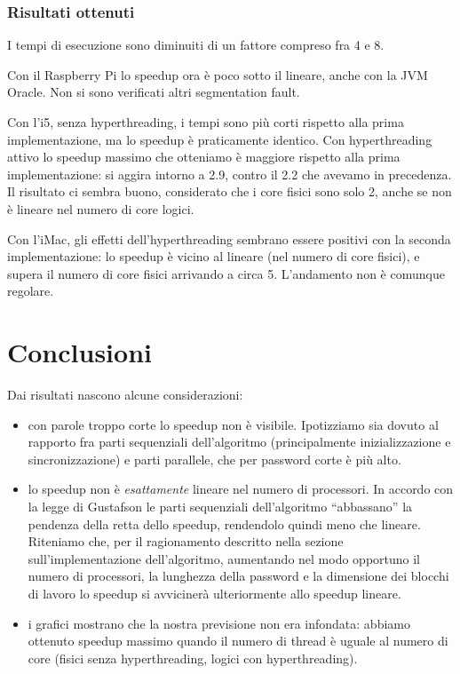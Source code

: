 \documentclass[]{myarticle}
\begin{document}
\subsubsection{Risultati ottenuti}

I tempi di esecuzione sono diminuiti di un fattore compreso fra 4 e 8.

Con il Raspberry Pi lo speedup ora \`e poco sotto il lineare, anche con la JVM Oracle.
Non si sono verificati altri segmentation fault.

Con l'i5, senza hyperthreading, i tempi sono pi\`u corti rispetto alla prima implementazione, ma lo speedup \`e praticamente identico.
Con hyperthreading attivo lo speedup massimo che otteniamo \`e maggiore rispetto alla prima implementazione: si aggira intorno a 2.9, contro il 2.2 che avevamo in precedenza.
Il risultato ci sembra buono, considerato che i core fisici sono solo 2, anche se non \`e lineare nel numero di core logici.

Con l'iMac, gli effetti dell'hyperthreading sembrano essere positivi con la seconda implementazione: lo speedup \`e vicino al lineare (nel numero di core fisici), e supera il numero di core fisici arrivando a circa 5.
L'andamento non \`e comunque regolare.

\section{Conclusioni}

Dai risultati nascono alcune considerazioni:
\begin{itemize}
	\item con parole troppo corte lo speedup non \`e visibile.
	Ipotizziamo sia dovuto al rapporto fra parti sequenziali dell'algoritmo (principalmente inizializzazione e sincronizzazione) e parti parallele, che per password corte \`e pi\`u alto.
	\item lo speedup non \`e \emph{esattamente} lineare nel numero di processori.
	In accordo con la legge di Gustafson le parti sequenziali dell'algoritmo ``abbassano'' la pendenza della retta dello speedup, rendendolo quindi meno che lineare.
	Riteniamo che, per il ragionamento descritto nella sezione sull'implementazione dell'algoritmo, aumentando nel modo opportuno il numero di processori, la lunghezza della password e la dimensione dei blocchi di lavoro lo speedup si avviciner\`a ulteriormente allo speedup lineare.
	\item i grafici mostrano che la nostra previsione non era infondata: abbiamo ottenuto speedup massimo quando il numero di thread \`e uguale al numero di core (fisici senza hyperthreading, logici con hyperthreading).
\end{itemize}
\end{document}
